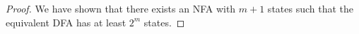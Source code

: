 \documentclass{article}
\theoremstyle{definition}
\begin{document}
\begin{enumerate}
\begin{proof}
We have shown that there exists an NFA with $m+1$ states such that the equivalent DFA has at least $2^m$ states. 
	
 
\end{proof}
\end{enumerate}
\end{document}
